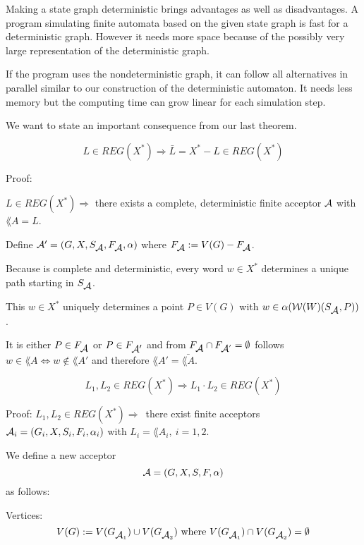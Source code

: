 Making a state graph deterministic brings advantages as well as disadvantages. A
program simulating finite automata based on the given state graph is fast for
a deterministic graph. However it needs more space because of the possibly very
large representation of the deterministic graph.

If the program uses the nondeterministic graph, it can follow all alternatives
in parallel similar to our construction of the deterministic automaton. It needs
less memory but the computing time can grow linear for each simulation step.

We want to state an important consequence from our last theorem.

\begin{theorem}
\[ L \in REG(X^*) \Rightarrow \bar{L} = X^* - L \in REG(X^*) \]
\end{theorem}

Proof: 

$L \in REG(X^*) \Rightarrow $ there exists a complete, deterministic
finite acceptor $\mbox{$\mathcal{A}$}$ with $\lang{A} = L$.

Define $\mbox{$\mathcal{A'}$} = (G, X, S_{\mbox{$\mathcal{A}$}}, F_{\mbox{$\mathcal{A}$}}, \alpha)$ where $F_{\mbox{$\mathcal{A}$}} :=
V(G) - F_{\mbox{$\mathcal{A}$}}$.

Because  is complete and deterministic, every word $w \in X^*$ determines
a unique path starting in $S_{\mbox{$\mathcal{A}$}}$.

This $w \in X^*$ uniquely determines a point $P \in V(G)$ with $w \in
\alpha(\mbox{$\mathcal{W}(W)$}(S_{\mbox{$\mathcal{A}$}}, P))$.

It is either $P \in F_{\mbox{$\mathcal{A}$}}$ or $P \in F_{\mbox{$\mathcal{A'}$}}$ and from $F_{\mbox{$\mathcal{A}$}}
\cap F_{\mbox{$\mathcal{A}$}'} = \emptyset$ follows $w \in \lang{A} \Leftrightarrow w
\notin \lang{A'}$ and therefore $\lang{A'} = \bar{\lang{A}}$.

\begin{theorem}
\[ L_1, L_2 \in REG(X^*) \Rightarrow L_1 \cdot L_2 \in REG(X^*) \]
\end{theorem}

Proof: $L_1, L_2 \in REG(X^*) \Rightarrow$\ there exist finite acceptors
$\mbox{$\mathcal{A}$}_i = (G_i, X, S_i, F_i, \alpha_i)$ with $L_i = \lang{A}_i,\ i = 1,2$.

We define a new acceptor
\[\mbox{$\mathcal{A}$} = (G, X, S, F, \alpha) \]
as follows:

Vertices:
\[ V(G) := V(G_{\mbox{$\mathcal{A}$}_1}) \cup V(G_{\mbox{$\mathcal{A}$}_2})\mbox{ where }V(G_{\mbox{$\mathcal{A}$}_1})
\cap V(G_{\mbox{$\mathcal{A}$}_2}) = \emptyset \]

